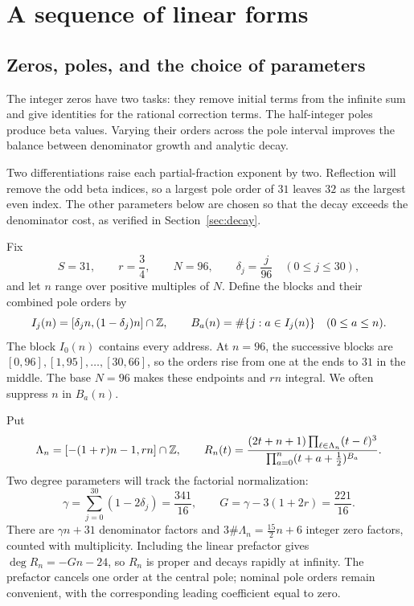 \section{A sequence of linear forms}\label{sec:forms}
\subsection{Zeros, poles, and the choice of parameters}
The integer zeros have two tasks: they remove initial terms from the
infinite sum and give identities for the rational correction terms.
The half-integer poles produce beta values. Varying their orders
across the pole interval improves the balance between denominator
growth and analytic decay.

Two differentiations raise each partial-fraction exponent by two.
Reflection will remove the odd beta indices, so a largest pole order
of $31$ leaves $32$ as the largest even index. The other parameters
below are chosen so that the decay exceeds the denominator cost,
as verified in Section~\ref{sec:decay}.

Fix
\begin{equation}\label{eq:parameters}
 S=31,\qquad r=\frac34,\qquad N=96,\qquad
 \delta_j=\frac{j}{96}\quad(0\le j\le30),
\end{equation}
and let $n$ range over positive multiples of $N$. Define the blocks
and their combined pole orders by
\[
 I_j(n)=[\delta_jn,(1-\delta_j)n]\cap\mathbb Z,\qquad
 B_a(n)=\#\{j:a\in I_j(n)\}\quad(0\le a\le n).
\]
The block $I_0(n)$ contains every address. At $n=96$, the successive
blocks are $[0,96],[1,95],\ldots,[30,66]$, so the orders rise from
one at the ends to $31$ in the middle. The base $N=96$ makes these
endpoints and $rn$ integral. We often suppress $n$ in $B_a(n)$.

Put
\[
 \Lambda_n=[-(1+r)n-1,rn]\cap\mathbb Z,
 \qquad
 R_n(t)=\frac{(2t+n+1)\prod_{\ell\in\Lambda_n}(t-\ell)^3}
 {\prod_{a=0}^{n}(t+a+\tfrac12)^{B_a}}.
\]
Two degree parameters will track the factorial normalization:
\begin{equation}\label{eq:degree-parameters}
 \gamma=\sum_{j=0}^{30}(1-2\delta_j)=\frac{341}{16},
 \qquad G=\gamma-3(1+2r)=\frac{221}{16}.
\end{equation}
There are $\gamma n+31$ denominator factors and
$3\#\Lambda_n=\tfrac{15}{2}n+6$ integer zero factors, counted with
multiplicity. Including the linear prefactor gives
$\deg R_n=-Gn-24$, so $R_n$ is proper and decays rapidly at infinity.
The prefactor cancels one order at the central pole; nominal pole
orders remain convenient, with the corresponding leading coefficient
equal to zero.

